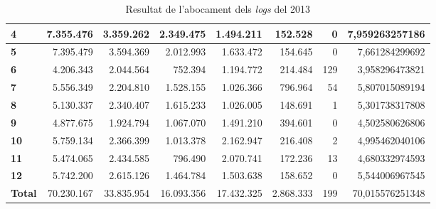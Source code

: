 \begin{table}[h!]
\begin{adjustbox}{width=1.2\textwidth, center}
\begin{tabular}{|l|r|r|r|r|r|r|r|}
            \textbf{4}     & 7.355.476  & 3.359.262  & 2.349.475  & 1.494.211  & 152.528   & 0   & 7,959263257186  \\
            \midrule
            \textbf{5}     & 7.395.479  & 3.594.369  & 2.012.993  & 1.633.472  & 154.645   & 0   & 7,661284299692  \\
            \textbf{6}     & 4.206.343  & 2.044.564  & 752.394    & 1.194.772  & 214.484   & 129 & 3,958296473821  \\
            \textbf{7}     & 5.556.349  & 2.204.810  & 1.528.155  & 1.026.366  & 796.964   & 54  & 5,807015089194  \\
            \textbf{8}     & 5.130.337  & 2.340.407  & 1.615.233  & 1.026.005  & 148.691   & 1   & 5,301738317808  \\
            \midrule
            \textbf{9}     & 4.877.675  & 1.924.794  & 1.067.070  & 1.491.210  & 394.601   & 0   & 4,502580626806  \\
            \textbf{10}    & 5.759.134  & 2.366.399  & 1.013.378  & 2.162.947  & 216.408   & 2   & 4,995462040106  \\
            \textbf{11}    & 5.474.065  & 2.434.585  & 796.490    & 2.070.741  & 172.236   & 13  & 4,680332974593  \\
            \textbf{12}    & 5.742.200  & 2.615.126  & 1.464.784  & 1.503.638  & 158.652   & 0   & 5,544006967545  \\
            \midrule
            \textbf{Total} & 70.230.167 & 33.835.954 & 16.093.356 & 17.432.325 & 2.868.333 & 199 & 70,015576251348 \\
            \bottomrule
        \end{tabular}
    \end{adjustbox}
    \caption{Resultat de l'abocament dels \textit{logs} del 2013}
    \label{tab:logs-table-2013}
\end{table}
